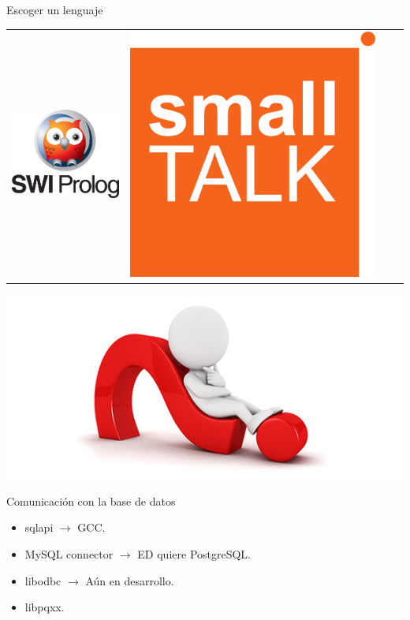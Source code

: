 \begin{frame}{Escoger un lenguaje}
\begin{center}
\begin{tabular}{c c c c}
      \includegraphics[scale=0.15]{img/prolog} &
      \includegraphics[scale=0.1]{img/smalltalk} \\
    \end{tabular}

    \includegraphics[scale=0.3]{img/choose_ed}
  \end{center}
\end{frame}

\begin{frame}{Comunicación con la base de datos}
  \begin{itemize}
    \item sqlapi \pause $\rightarrow$ GCC. \pause
    \item MySQL connector \pause $\rightarrow$ ED quiere PostgreSQL. \pause
    \item libodbc \pause $\rightarrow$ Aún en desarrollo. \pause
    \item libpqxx.
  \end{itemize}
\end{frame}

